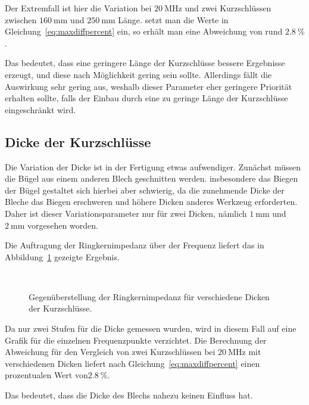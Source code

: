 \par
Der Extremfall ist hier die Variation bei $\SI{20}{\mega\hertz}$ und zwei Kurzschl\"ussen zwischen $\SI{160}{\milli\meter}$ und $\SI{250}{\milli\meter}$ L\"ange. setzt man die Werte in Gleichung~\ref{eq:maxdiffpercent} ein, so erh\"alt man eine Abweichung von rund  $\SI{2,8}{\%}$. 
\par
Das bedeutet, dass eine geringere L\"ange der Kurzschl\"usse bessere Ergebnisse erzeugt, und diese nach M\"oglichkeit gering sein sollte. Allerdings f\"allt die Auswirkung sehr gering aus, weshalb dieser Parameter eher geringere Priorit\"at erhalten sollte, falls der Einbau durch eine zu geringe L\"ange der Kurzschl\"usse eingeschr\"ankt wird.

\subsection{Dicke der Kurzschl\"usse}
Die Variation der Dicke ist in der Fertigung etwas aufwendiger. Zun\"achst m\"ussen die B\"ugel aus einem anderen Blech geschnitten werden. insbesondere das Biegen der B\"ugel gestaltet sich hierbei aber schwierig, da die zunehmende Dicke der Bleche das Biegen erschweren und h\"ohere Dicken anderes Werkzeug erforderten. Daher ist dieser Variationsparameter nur f\"ur zwei Dicken, n\"amlich $\SI{1}{\milli\meter}$ und $\SI{2}{\milli\meter}$ vorgesehen worden.
\par
Die Auftragung der Ringkernimpedanz \"uber der Frequenz liefert das in Abbildung~\ref{fig:ringcorethick} gezeigte Ergebnis.
\begin{figure}[htb]
	\centering
	\\
	\caption{Gegen\"uberstellung der Ringkernimpedanz f\"ur verschiedene Dicken der Kurzschl\"usse.}
	\label{fig:ringcorethick}
\end{figure}
\par
Da nur zwei Stufen f\"ur die Dicke gemessen wurden, wird in diesem Fall auf eine Grafik f\"ur die einzelnen Frequenzpunkte verzichtet. Die Berechnung der Abweichung f\"ur den Vergleich von zwei Kurzschl\"ussen bei $\SI{20}{\mega\hertz}$ mit verschiedenen Dicken liefert nach Gleichung~\ref{eq:maxdiffpercent} einen prozentualen Wert von$\SI{2,8}{\%}$. 
\par
Das bedeutet, dass die Dicke des Blechs nahezu keinen Einfluss hat.
